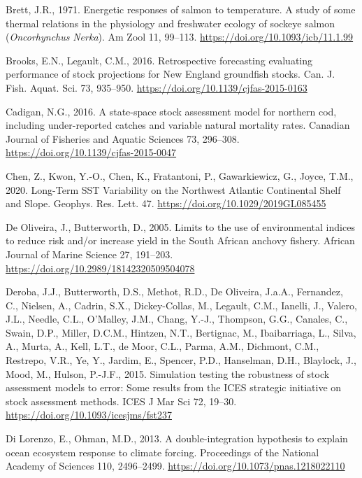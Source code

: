 \documentclass[]{article}
\begin{document}
\leavevmode\hypertarget{ref-brett1971Energetic}{}%
Brett, J.R., 1971. Energetic responses of salmon to temperature. A study
of some thermal relations in the physiology and freshwater ecology of
sockeye salmon (\emph{Oncorhynchus} \emph{Nerka}). Am Zool 11, 99--113.
\url{https://doi.org/10.1093/icb/11.1.99}

\leavevmode\hypertarget{ref-brooks2016Retrospective}{}%
Brooks, E.N., Legault, C.M., 2016. Retrospective forecasting evaluating
performance of stock projections for New England groundfish stocks. Can.
J. Fish. Aquat. Sci. 73, 935--950.
\url{https://doi.org/10.1139/cjfas-2015-0163}

\leavevmode\hypertarget{ref-cadigan2016Statespace}{}%
Cadigan, N.G., 2016. A state-space stock assessment model for northern
cod, including under-reported catches and variable natural mortality
rates. Canadian Journal of Fisheries and Aquatic Sciences 73, 296--308.
\url{https://doi.org/10.1139/cjfas-2015-0047}

\leavevmode\hypertarget{ref-chen2020Long}{}%
Chen, Z., Kwon, Y.-O., Chen, K., Fratantoni, P., Gawarkiewicz, G.,
Joyce, T.M., 2020. Long-Term SST Variability on the Northwest Atlantic
Continental Shelf and Slope. Geophys. Res. Lett. 47.
\url{https://doi.org/10.1029/2019GL085455}

\leavevmode\hypertarget{ref-deoliveira2005Limits}{}%
De Oliveira, J., Butterworth, D., 2005. Limits to the use of
environmental indices to reduce risk and/or increase yield in the South
African anchovy fishery. African Journal of Marine Science 27, 191--203.
\url{https://doi.org/10.2989/18142320509504078}

\leavevmode\hypertarget{ref-deroba2015Simulation}{}%
Deroba, J.J., Butterworth, D.S., Methot, R.D., De Oliveira, J.a.A.,
Fernandez, C., Nielsen, A., Cadrin, S.X., Dickey-Collas, M., Legault,
C.M., Ianelli, J., Valero, J.L., Needle, C.L., O'Malley, J.M., Chang,
Y.-J., Thompson, G.G., Canales, C., Swain, D.P., Miller, D.C.M.,
Hintzen, N.T., Bertignac, M., Ibaibarriaga, L., Silva, A., Murta, A.,
Kell, L.T., de Moor, C.L., Parma, A.M., Dichmont, C.M., Restrepo, V.R.,
Ye, Y., Jardim, E., Spencer, P.D., Hanselman, D.H., Blaylock, J., Mood,
M., Hulson, P.-J.F., 2015. Simulation testing the robustness of stock
assessment models to error: Some results from the ICES strategic
initiative on stock assessment methods. ICES J Mar Sci 72, 19--30.
\url{https://doi.org/10.1093/icesjms/fst237}

\leavevmode\hypertarget{ref-dilorenzo2013Doubleintegration}{}%
Di Lorenzo, E., Ohman, M.D., 2013. A double-integration hypothesis to
explain ocean ecosystem response to climate forcing. Proceedings of the
National Academy of Sciences 110, 2496--2499.
\url{https://doi.org/10.1073/pnas.1218022110}
\end{document}
